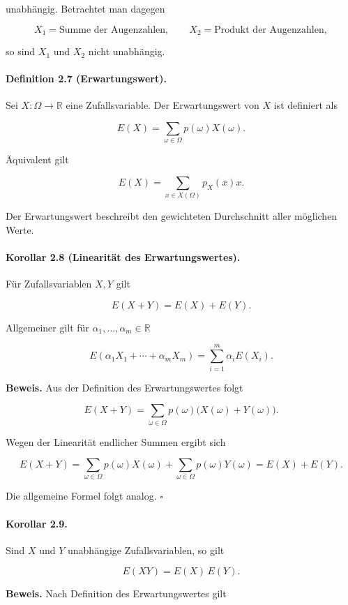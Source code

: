 \documentclass{article}
\begin{document}
unabhängig. Betrachtet man dagegen

\[
X_1=\text{Summe der Augenzahlen},
\qquad
X_2=\text{Produkt der Augenzahlen},
\]

so sind \(X_1\) und \(X_2\) nicht unabhängig.

\medskip

\paragraph{Definition 2.7 (Erwartungswert).}
Sei \(X:\Omega\to\mathbb R\) eine Zufallsvariable. Der Erwartungswert von \(X\) ist definiert als

\[
E(X)=\sum_{\omega\in\Omega}p(\omega)X(\omega).
\]

Äquivalent gilt

\[
E(X)=\sum_{x\in X(\Omega)}p_X(x)x.
\]

Der Erwartungswert beschreibt den gewichteten Durchschnitt aller möglichen Werte.

\paragraph{Korollar 2.8 (Linearität des Erwartungswertes).}
Für Zufallsvariablen \(X,Y\) gilt

\[
E(X+Y)=E(X)+E(Y).
\]

Allgemeiner gilt für \(\alpha_1,\dots,\alpha_m\in\mathbb{R}\)

\[
E\!\left(\alpha_1X_1+\cdots+\alpha_mX_m\right)
=
\sum_{i=1}^{m}\alpha_iE(X_i).
\]

\textbf{Beweis.}
Aus der Definition des Erwartungswertes folgt

\[
E(X+Y)
=
\sum_{\omega\in\Omega}
p(\omega)\bigl(X(\omega)+Y(\omega)\bigr).
\]

Wegen der Linearität endlicher Summen ergibt sich

\[
E(X+Y)
=
\sum_{\omega\in\Omega}p(\omega)X(\omega)
+
\sum_{\omega\in\Omega}p(\omega)Y(\omega)
=
E(X)+E(Y).
\]

Die allgemeine Formel folgt analog.
\hfill\(\square\)

\medskip

\paragraph{Korollar 2.9.}
Sind \(X\) und \(Y\) unabhängige Zufallsvariablen, so gilt

\[
E(XY)=E(X)\,E(Y).
\]

\textbf{Beweis.}
Nach Definition des Erwartungswertes gilt
\end{document}
